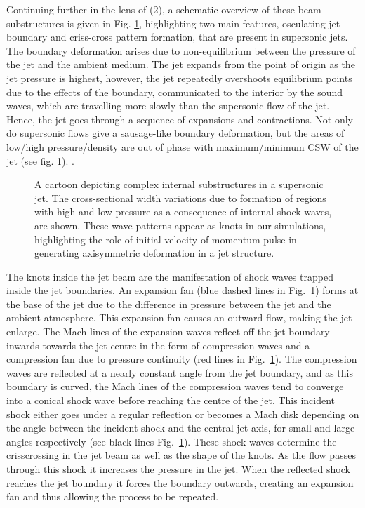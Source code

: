 Continuing further in the lens of (2), a schematic overview of these beam substructures is given in Fig. \ref{cartoon_jet_waves}, highlighting two main features, osculating jet boundary and criss-cross pattern formation, that are present in supersonic jets. The boundary deformation arises due to non-equilibrium between the pressure of the jet and the ambient medium. The jet expands from the point of origin as the jet pressure is highest, however, the jet repeatedly overshoots equilibrium points due to the effects of the boundary, communicated to the interior by the sound waves, which are travelling more slowly than the supersonic flow of the jet. Hence, the jet goes through a sequence of expansions and contractions. Not only do supersonic flows give a sausage-like boundary deformation, but the areas of low/high pressure/density are out of phase with maximum/minimum CSW of the jet (see fig. \ref{cartoon_jet_waves}). . \np 
%
\begin{figure}
\captionsetup[subfigure]{labelformat=empty}
\centering
{}
\caption{A cartoon depicting complex internal substructures in a supersonic jet. The cross-sectional width variations due to formation of regions with high and low pressure as a consequence of internal shock waves, are shown. These wave patterns appear as knots in our simulations, highlighting the role of initial velocity of momentum pulse in generating axisymmetric deformation in a jet structure. }
\label{cartoon_jet_waves}
\end{figure}
The knots inside the jet beam are the manifestation of shock waves trapped inside the jet boundaries. An expansion fan (blue dashed lines in Fig.~\ref{cartoon_jet_waves}) forms at the base of the jet due to the difference in pressure between the jet and the ambient atmosphere. This expansion fan causes an outward flow, making the jet enlarge. The Mach lines of the expansion waves reflect off the jet boundary inwards towards the jet centre in the form of compression waves and a compression fan due to pressure continuity (red lines in Fig.~\ref{cartoon_jet_waves}). The compression waves are reflected at a nearly constant angle from the jet boundary, and as this boundary is curved, the Mach lines of the compression waves tend to converge into a conical shock wave before reaching the centre of the jet. This incident shock either goes under a regular reflection or becomes a Mach disk depending on the angle between the incident shock and the central jet axis, for small and large angles respectively (see black lines Fig.~\ref{cartoon_jet_waves}). These shock waves determine the crisscrossing in the jet beam as well as the shape of the knots. As the flow passes through this shock it increases the pressure in the jet. When the reflected shock reaches the jet boundary it forces the boundary outwards, creating an expansion fan and thus allowing the process to be repeated. \np
